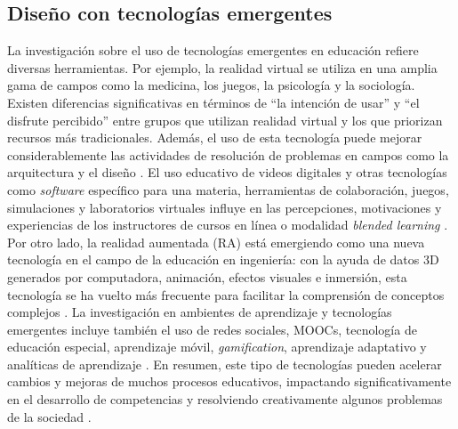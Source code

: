\documentclass[spanish]{textolivre}
\begin{document}
\subsection{Diseño con tecnologías emergentes}
La investigación sobre el uso de tecnologías emergentes en educación refiere diversas herramientas. Por ejemplo, la realidad virtual se utiliza en una amplia gama de campos como la medicina, los juegos, la psicología y la sociología. Existen diferencias significativas en términos de “la intención de usar” y “el disfrute percibido” entre grupos que utilizan realidad virtual y los que priorizan recursos más tradicionales. Además, el uso de esta tecnología puede mejorar considerablemente las actividades de resolución de problemas en campos como la arquitectura y el diseño \cite{ozgen2021}. El uso educativo de videos digitales y otras tecnologías como \emph{software} específico para una materia, herramientas de colaboración, juegos, simulaciones y laboratorios virtuales influye en las percepciones, motivaciones y experiencias de los instructores de cursos en línea o modalidad \emph{blended learning} \cite{meletiou-mavrotheris2021}. Por otro lado, la realidad aumentada (RA) está emergiendo como una nueva tecnología en el campo de la educación en ingeniería: con la ayuda de datos 3D generados por computadora, animación, efectos visuales e inmersión, esta tecnología se ha vuelto más frecuente para facilitar la comprensión de conceptos complejos \cite{kumar2021}. La investigación en ambientes de aprendizaje y tecnologías emergentes incluye también el uso de redes sociales, MOOCs, tecnología de educación especial, aprendizaje móvil, \emph{gamification}, aprendizaje adaptativo y analíticas de aprendizaje \cite{martin2020}. En resumen, este tipo de tecnologías pueden acelerar cambios y mejoras de muchos procesos educativos, impactando significativamente en el desarrollo de competencias y resolviendo creativamente algunos problemas de la sociedad \cite{hidrogo2020}.
\end{document}
